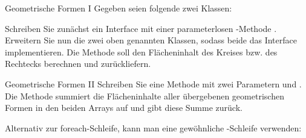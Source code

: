 \documentclass{../tuda-exercise}
\begin{document}
  \clearpagesolution

  \begin{task}[credit=\stars{1}{3}]{Geometrische Formen I}
    Gegeben seien folgende zwei Klassen:

    

    Schreiben Sie zunächst ein Interface  mit einer parameterlosen
    -Methode . Erweitern Sie nun die zwei oben
    genannten Klassen, sodass beide das Interface  implementieren. Die
    Methode  soll den Flächeninhalt des Kreises bzw. des Rechtecks
    berechnen und zurückliefern.

    \begin{solution}
      
    \end{solution}
  \end{task}

  \begin{task}[credit=\stars{1}{3}]{Geometrische Formen II}
    Schreiben Sie eine Methode  mit zwei Parametern
     und . Die Methode summiert
    die Flächeninhalte aller übergebenen geometrischen Formen in den beiden Arrays auf und gibt
    diese Summe zurück.

    \begin{solution}
      

      \begin{note}[title=Information:]
        Alternativ zur foreach-Schleife, kann man eine gewöhnliche -Schleife
        verwenden:

        
      \end{note}
    \end{solution}
  \end{task}

  \clearpagesolution
\end{document}

